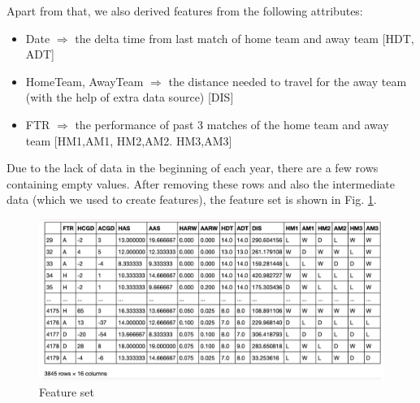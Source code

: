 \documentclass{article}
\begin{document}
Apart from that, we also derived features from the following attributes:
\begin{itemize}
\item Date $\Rightarrow$  the delta time from last match of home team and away team  [HDT, ADT]
\item HomeTeam, AwayTeam $\Rightarrow$  the distance needed to travel for the away team (with the help of extra data source) [DIS]
\item FTR $\Rightarrow$ the performance of past 3 matches of the home team and away team [HM1,AM1, HM2,AM2. HM3,AM3]
\end{itemize}

Due to the lack of data in the beginning of each year, there are a few rows containing empty values. After removing these rows and also the intermediate data (which we used to create features), the feature set is shown in  Fig. \ref{fig:featureSet}.
\begin{figure}[ht]
\centering
\includegraphics[scale=0.4]{graphs/featureSetWithLabel.png}
\caption{Feature set}
\label{fig:featureSet}
\end{figure}
\end{document}
